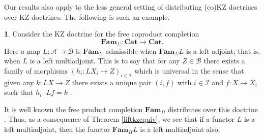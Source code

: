 \documentclass[a4paper,oneside,english]{amsart}
\numberwithin{equation}{section}
\numberwithin{figure}{section}
\theoremstyle{plain}
\theoremstyle{definition}
\theoremstyle{remark}
\theoremstyle{definition}
\newtheorem{example}[thm]{\protect\examplename}
\theoremstyle{plain}
\theoremstyle{plain}
\theoremstyle{plain}
\providecommand{\examplename}{Example}
\begin{document}
Our results also apply to the less general setting of distributing
(co)KZ doctrines over KZ doctrines. The following is such an example.
\begin{example}
Consider the KZ doctrine for the free coproduct completion 
\[
\mathbf{Fam}_{\Sigma}\colon\mathbf{Cat}\to\mathbf{Cat}.
\]
 Here a map $L\colon\mathcal{A}\to\mathcal{B}$ is $\mathbf{Fam}_{\Sigma}$-admissible
when $\mathbf{Fam}_{\Sigma}L$ is a left adjoint; that is, when $L$
is a left multiadjoint. This is to say that for any $Z\in\mathcal{B}$
there exists a family of morphisms $\left(h_{i}\colon LX_{i}\to Z\right)_{i\in\mathcal{I}}$
which is universal in the sense that given any $k\colon LX\to Z$
there exists a unique pair $\left(i,f\right)$ with $i\in\mathcal{I}$
and $f\colon X\to X_{i}$ such that $h_{i}\cdot Lf=k$ \cite{diers}.

It is well known the free product completion $\mathbf{Fam}_{\Pi}$
distributes over this doctrine \cite[Section 8]{marm2012}. Thus,
as a consequence of Theorem \ref{liftkzequiv}, we see that if a functor
$L$ is a left multiadjoint, then the functor $\mathbf{Fam}_{\Pi}L$
is a left multiadjoint also.
\end{example}


\end{document}
